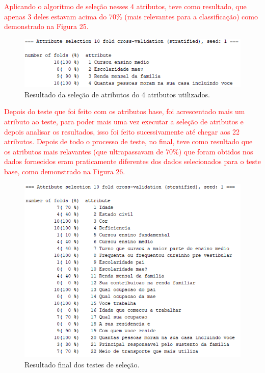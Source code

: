 \par\textcolor{red}{Aplicando o algoritmo de seleção nesses 4 atributos, teve como resultado, que apenas 3 deles estavam acima do 70\%  (mais relevantes para a classificação) como demonstrado na Figura 25.}

\par
\begin{figure}[!htp]
	\begin{center}
    \caption{\label{fig:waveform_fig} Resultado da seleção de atributos do 4 atributos utilizados.}
	\includegraphics[scale=0.99]{Figuras/4_atributos.png}
	\end{center}
\end{figure}

\par
\textcolor{red}{Depois do teste que foi feito com os atributos base, foi acrescentado mais um atributo ao teste, para poder mais uma vez executar a seleção de atributos e depois analisar os resultados, isso foi feito sucessivamente até chegar aos 22 atributos. Depois de todo o processo de teste, no final, teve como resultado que os atributos mais relavantes (que ultrapassavam de 70\%) que foram obtidos nos dados fornecidos eram praticamente diferentes dos dados selecionados para o teste base, como demonstrado na Figura 26.}

\par
\begin{figure}[!htp]
	\begin{center}
    \caption{\label{fig:waveform_fig} Resultado final dos testes de seleção.}
	\includegraphics[scale=0.90]{Figuras/22_atributos.png}
	\end{center}
\end{figure}

